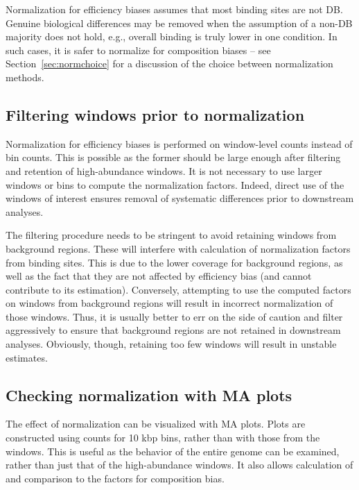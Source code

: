 \documentclass{report}\usepackage[]{graphicx}\usepackage[usenames,dvipsnames]{color}
\begin{document}
Normalization for efficiency biases assumes that most binding sites are not DB.
Genuine biological differences may be removed when the assumption of a non-DB majority does not hold, e.g., overall binding is truly lower in one condition. 
In such cases, it is safer to normalize for composition biases -- see Section~\ref{sec:normchoice} for a discussion of the choice between normalization methods.

\subsection{Filtering windows prior to normalization}
Normalization for efficiency biases is performed on window-level counts instead of bin counts.
This is possible as the former should be large enough after filtering and retention of high-abundance windows.
It is not necessary to use larger windows or bins to compute the normalization factors.
Indeed, direct use of the windows of interest ensures removal of systematic differences prior to downstream analyses.

The filtering procedure needs to be stringent to avoid retaining windows from background regions.
These will interfere with calculation of normalization factors from binding sites.
This is due to the lower coverage for background regions, as well as the fact that they are not affected by efficiency bias (and cannot contribute to its estimation).
Conversely, attempting to use the computed factors on windows from background regions will result in incorrect normalization of those windows.
Thus, it is usually better to err on the side of caution and filter aggressively to ensure that background regions are not retained in downstream analyses.
Obviously, though, retaining too few windows will result in unstable estimates.

\subsection{Checking normalization with MA plots}
\label{sec:eff_norm_ma}

The effect of normalization can be visualized with MA plots. 
Plots are constructed using counts for 10 kbp bins, rather than with those from the windows.
This is useful as the behavior of the entire genome can be examined, rather than just that of the high-abundance windows.
It also allows calculation of and comparison to the factors for composition bias.
\end{document}
